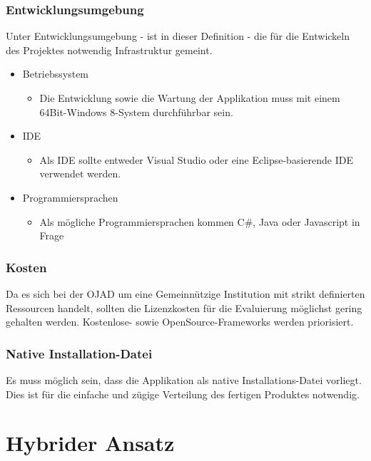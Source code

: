 \documentclass[../Bachelorarbeit.tex]{subfiles}
\begin{document}
\subsubsection*{Entwicklungsumgebung}
Unter Entwicklungsumgebung - ist in dieser Definition - die für die  Entwickeln des Projektes notwendig Infrastruktur gemeint. 

\begin{itemize}
\item Betriebssystem
\begin{itemize}
\item Die Entwicklung sowie die Wartung der Applikation muss mit einem 64Bit-Windows 8-System durchführbar sein.
\end{itemize}
\item \ac{IDE}
\begin{itemize}
\item Als \ac{IDE} sollte entweder Visual Studio oder eine Eclipse-basierende \ac{IDE} verwendet werden.
\end{itemize}
\item Programmiersprachen
\begin{itemize}
\item Als mögliche Programmiersprachen kommen C\#, Java oder Javascript in Frage
\end{itemize}
\end{itemize}


\subsubsection*{Kosten}
Da es sich bei der \ac{OJAD} um eine Gemeinnützige Institution mit strikt definierten Ressourcen handelt, sollten die Lizenzkosten für die Evaluierung möglichst gering gehalten werden. Kostenlose- sowie OpenSource-Frameworks werden priorisiert.   

\subsubsection*{Native Installation-Datei}
Es muss möglich sein, dass die Applikation als native Installations-Datei vorliegt. Dies ist für die einfache und zügige Verteilung des fertigen Produktes notwendig.
\newpage

\section{Hybrider Ansatz}
\label{subsec:hybrid_framework}
\end{document}
